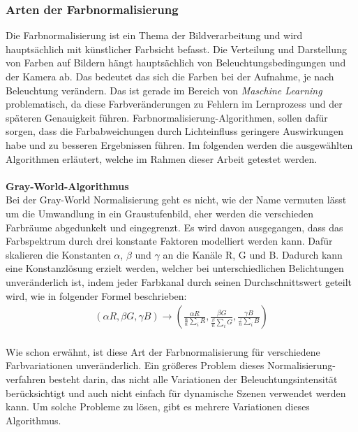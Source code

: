 \documentclass[a4paper,12pt,oneside]{article}
\begin{document}
  \subsubsection{Arten der Farbnormalisierung}\label{s.farbnormalisierungen}
Die Farbnormalisierung ist ein Thema der Bildverarbeitung und wird hauptsächlich mit künstlicher Farbsicht befasst. Die Verteilung und Darstellung von Farben auf Bildern hängt hauptsächlich von Beleuchtungsbedingungen und der Kamera ab. Das bedeutet das sich die Farben bei der Aufnahme, je nach Beleuchtung verändern. Das ist gerade im Bereich von \textit{Maschine Learning} problematisch, da diese Farbveränderungen zu Fehlern im Lernprozess und der späteren Genauigkeit führen. Farbnormalisierung-Algorithmen, sollen dafür sorgen, dass die Farbabweichungen durch Lichteinfluss geringere Auswirkungen habe und zu besseren Ergebnissen führen. Im folgenden werden die ausgewählten Algorithmen erläutert, welche im Rahmen dieser Arbeit getestet werden.\\\\
\textbf{Gray-World-Algorithmus}\label{s.gw}\\
Bei der Gray-World Normalisierung geht es nicht, wie der Name vermuten lässt um die Umwandlung in ein Graustufenbild, eher werden die verschieden Farbräume abgedunkelt und eingegrenzt. Es wird davon ausgegangen, dass das Farbspektrum durch drei konstante Faktoren modelliert werden kann. Dafür skalieren die Konstanten $\alpha$, $\beta$ und $\gamma$ an die Kanäle R, G und B. Dadurch kann eine Konstanzlösung erzielt werden, welcher bei unterschiedlichen Belichtungen unveränderlich ist, indem jeder Farbkanal durch seinen Durchschnittswert geteilt wird, wie in folgender Formel beschrieben:\\
\begin{eqnarray} (\alpha R, \beta G, \gamma B) \rightarrow\left(\frac{\alpha R} {\frac{\alpha}{n} \sum_{i} R}, \frac{\beta G} {\frac{\beta}{n} \sum_{i} G}, \frac{\gamma B} {\frac{\gamma}{n} \sum_{i} B} \right) \end{eqnarray}\\
Wie schon erwähnt, ist diese Art der Farbnormalisierung für verschiedene Farbvariationen unveränderlich. Ein größeres Problem dieses Normalisierung-verfahren besteht darin, das nicht alle Variationen der Beleuchtungsintensität berücksichtigt und auch nicht einfach für dynamische Szenen verwendet werden kann. Um solche Probleme zu lösen, gibt es mehrere Variationen dieses Algorithmus.\\\\
\end{document}
